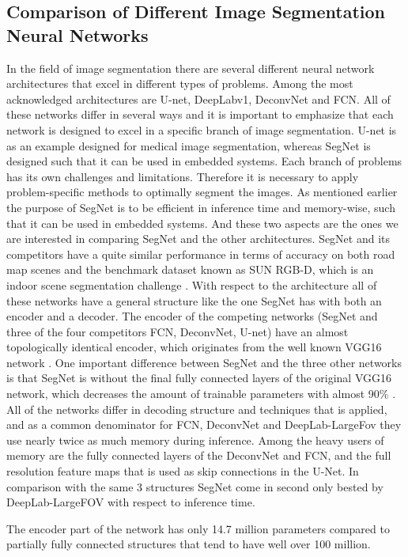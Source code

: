 \documentclass{article}
\begin{document}
\subsection{Comparison of Different Image Segmentation Neural Networks}
In the field of image segmentation there are several different neural network architectures that excel in different types of problems. Among the most acknowledged architectures are U-net, DeepLabv1, DeconvNet and FCN. 
All of these networks differ in several ways and it is important to emphasize that each network is designed to excel in a specific branch of image segmentation. U-net is as an example designed for medical image segmentation, whereas SegNet is designed such that it can be used in embedded systems. Each branch of problems has its own challenges and limitations. Therefore it is necessary to apply problem-specific methods to optimally segment the images. 
As mentioned earlier the purpose of SegNet is to be efficient in inference time and memory-wise, such that it can be used in embedded systems. And these two aspects are the ones we are interested in comparing SegNet and the other architectures. 
SegNet and its competitors have a quite similar performance in terms of accuracy on both road map scenes and the benchmark dataset known as SUN RGB-D, which is an indoor scene segmentation challenge \cite{seg}. 
With respect to the architecture all of these networks have a general structure like the one SegNet has with both an encoder and a decoder. The encoder of the competing networks (SegNet and three of the four competitors FCN, DeconvNet, U-net) have an almost topologically identical encoder, which originates from the well known VGG16 network \cite{VGG16}. One important difference between SegNet and the three other networks is that SegNet is without the final fully connected layers of the original VGG16 network, which decreases the amount of trainable parameters with almost 90\% \cite{seg}. 
All of the networks differ in decoding structure and techniques that is applied, and as a common denominator for FCN, DeconvNet and DeepLab-LargeFov they use nearly twice as much memory during inference. Among the heavy users of memory are the fully connected layers of the DeconvNet and FCN, and the full resolution feature maps that is used as skip connections in the U-Net. In comparison with the same 3 structures SegNet come in second only bested by DeepLab-LargeFOV with respect to inference time.


The encoder part of the network has only 14.7 million parameters compared to partially fully connected structures that tend to have well over 100 million. \cite{seg}
\end{document}
